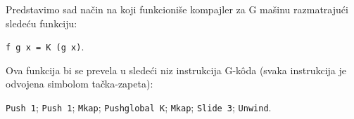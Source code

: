 \begin{primer}
	Predstavimo sad način na koji funkcioniše kompajler za G mašinu razmatrajući sledeću funkciju:
	\begin{center}
		\verb|f g x = K (g x)|.
	\end{center}
	Ova funkcija bi se prevela u sledeći niz instrukcija G-k\^ oda (svaka instrukcija je odvojena simbolom tačka-zapeta):
	\begin{center}
		\verb|Push 1|; \verb|Push 1|; \verb|Mkap|; \verb|Pushglobal K|; \verb|Mkap|; \verb|Slide 3|; \verb|Unwind|.
	\end{center}
\end{primer}

